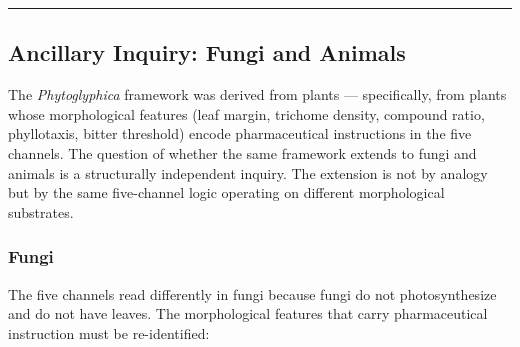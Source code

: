 \begin{center}\rule{0.5\linewidth}{0.5pt}\end{center}

\hypertarget{ancillary-inquiry-fungi-and-animals}{%
\subsection{Ancillary Inquiry: Fungi and
Animals}\label{ancillary-inquiry-fungi-and-animals}}

The \emph{Phytoglyphica} framework was derived from plants ---
specifically, from plants whose morphological features (leaf margin,
trichome density, compound ratio, phyllotaxis, bitter threshold) encode
pharmaceutical instructions in the five channels. The question of
whether the same framework extends to fungi and animals is a
structurally independent inquiry. The extension is not by analogy but by
the same five-channel logic operating on different morphological
substrates.

\hypertarget{fungi}{%
\subsubsection{Fungi}\label{fungi}}

The five channels read differently in fungi because fungi do not
photosynthesize and do not have leaves. The morphological features that
carry pharmaceutical instruction must be re-identified:

